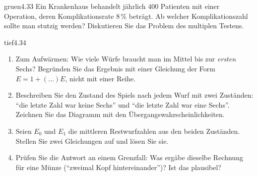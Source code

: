 \begin{karte}{gruen}{4.33}{\typwerk}{}
Ein Krankenhaus behandelt jährlich $400$ Patienten mit einer Operation, deren Komplikationsrate $8\,\%$ beträgt. Ab welcher Komplikationszahl sollte man stutzig werden? Diskutieren Sie das Problem des multiplen Testens.
\end{karte}

\begin{karte}{tief}{4.34}{\typtypisch}{}
\begin{enumerate}[label=(\alph*),leftmargin=1.6em,itemsep=2pt]
\item Zum Aufwärmen: Wie viele Würfe braucht man im Mittel bis zur \emph{ersten} Sechs? Begründen Sie das Ergebnis mit einer Gleichung der Form $E = 1 + (\dots)E$, nicht mit einer Reihe.
\item Beschreiben Sie den Zustand des Spiels nach jedem Wurf mit zwei Zuständen: \enquote{die letzte Zahl war keine Sechs} und \enquote{die letzte Zahl war eine Sechs}. Zeichnen Sie das Diagramm mit den Übergangswahrscheinlichkeiten.
\item Seien $E_0$ und $E_1$ die mittleren Restwurfzahlen aus den beiden Zuständen. Stellen Sie zwei Gleichungen auf und lösen Sie sie.
\item Prüfen Sie die Antwort an einem Grenzfall: Was ergäbe dieselbe Rechnung für eine Münze (\enquote{zweimal Kopf hintereinander})? Ist das plausibel?
\end{enumerate}
\end{karte}


